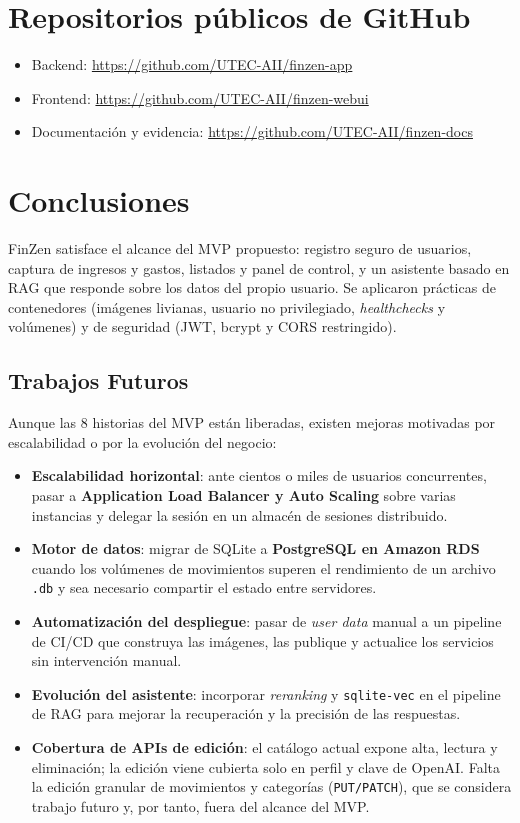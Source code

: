 \documentclass[12pt,letterpaper]{article}
\begin{document}
\section{Repositorios p\'ublicos de GitHub}
\begin{itemize}[leftmargin=1.2cm]
  \item Backend: \url{https://github.com/UTEC-AII/finzen-app}
  \item Frontend: \url{https://github.com/UTEC-AII/finzen-webui}
  \item Documentaci\'on y evidencia: \url{https://github.com/UTEC-AII/finzen-docs}
\end{itemize}

\section{Conclusiones}
FinZen satisface el alcance del MVP propuesto: registro seguro de usuarios, captura
de ingresos y gastos, listados y panel de control, y un asistente basado en RAG que
responde sobre los datos del propio usuario. Se aplicaron pr\'acticas de contenedores
(im\'agenes livianas, usuario no privilegiado, \emph{healthchecks} y vol\'umenes) y de
seguridad (JWT, bcrypt y CORS restringido).

\subsection{Trabajos Futuros}
Aunque las 8 historias del MVP est\'an liberadas, existen mejoras motivadas por
escalabilidad o por la evoluci\'on del negocio:

\begin{itemize}[leftmargin=1.2cm]
  \item \textbf{Escalabilidad horizontal}: ante cientos o miles de usuarios concurrentes, pasar a
        \textbf{Application Load Balancer y Auto Scaling} sobre varias instancias y delegar la
        sesi\'on en un almac\'en de sesiones distribuido.
  \item \textbf{Motor de datos}: migrar de SQLite a \textbf{PostgreSQL en Amazon RDS} cuando los
        vol\'umenes de movimientos superen el rendimiento de un archivo \texttt{.db} y sea
        necesario compartir el estado entre servidores.
  \item \textbf{Automatizaci\'on del despliegue}: pasar de \emph{user data} manual a un pipeline de
        CI/CD que construya las im\'agenes, las publique y actualice los servicios sin intervenci\'on
        manual.
  \item \textbf{Evoluci\'on del asistente}: incorporar \emph{reranking} y \texttt{sqlite-vec} en el
        pipeline de RAG para mejorar la recuperaci\'on y la precisi\'on de las respuestas.
  \item \textbf{Cobertura de APIs de edici\'on}: el cat\'alogo actual expone alta, lectura y
        eliminaci\'on; la edici\'on viene cubierta solo en perfil y clave de OpenAI. Falta la
        edici\'on granular de movimientos y categor\'ias (\texttt{PUT/PATCH}), que se considera
        trabajo futuro y, por tanto, fuera del alcance del MVP.
\end{itemize}
\end{document}
